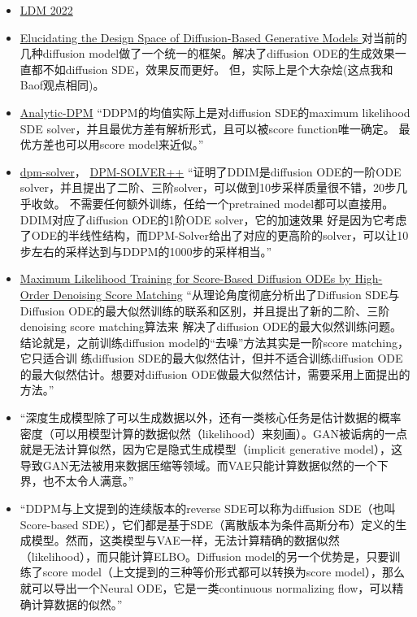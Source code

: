 \begin{itemize}
  \item \href{https://arxiv.org/abs/2112.10752}{LDM 2022}

  \item \href{https://arxiv.org/pdf/2206.00364.pdf}{Elucidating the Design Space of Diffusion-Based Generative Models }
  对当前的几种diffusion model做了一个统一的框架。解决了diffusion ODE的生成效果一直都不如diffusion SDE，效果反而更好。
  但，实际上是个大杂烩(这点我和Baof观点相同)。
  \item \href{https://arxiv.org/abs/2201.06503}{Analytic-DPM}
  “DDPM的均值实际上是对diffusion SDE的maximum likelihood SDE solver，并且最优方差有解析形式，且可以被score function唯一确定。
  最优方差也可以用score model来近似。”
  \item \href{https://github.com/LuChengTHU/dpm-solver}{dpm-solver}，
  \href{https://arxiv.org/pdf/2211.01095.pdf}{DPM-SOLVER++}
  “证明了DDIM是diffusion ODE的一阶ODE solver，并且提出了二阶、三阶solver，可以做到10步采样质量很不错，20步几乎收敛。
  不需要任何额外训练，任给一个pretrained model都可以直接用。 DDIM对应了diffusion ODE的1阶ODE solver，它的加速效果
  好是因为它考虑了ODE的半线性结构，而DPM-Solver给出了对应的更高阶的solver，可以让10步左右的采样达到与DDPM的1000步的采样相当。”
  \item \href{https://arxiv.org/pdf/2206.08265.pdf}{Maximum Likelihood Training for Score-Based Diffusion ODEs by High-Order Denoising Score Matching}
  “从理论角度彻底分析出了Diffusion SDE与Diffusion ODE的最大似然训练的联系和区别，并且提出了新的二阶、三阶denoising score matching算法来
  解决了diffusion ODE的最大似然训练问题。结论就是，之前训练diffusion model的“去噪”方法其实是一阶score matching，它只适合训
  练diffusion SDE的最大似然估计，但并不适合训练diffusion ODE的最大似然估计。想要对diffusion ODE做最大似然估计，需要采用上面提出的方法。”
  \item “深度生成模型除了可以生成数据以外，还有一类核心任务是估计数据的概率密度（可以用模型计算的数据似然（likelihood）来刻画）。GAN被诟病的一点就是无法计算似然，因为它是隐式生成模型（implicit generative model），这导致GAN无法被用来数据压缩等领域。而VAE只能计算数据似然的一个下界，也不太令人满意。”
  \item “DDPM与上文提到的连续版本的reverse SDE可以称为diffusion SDE（也叫Score-based SDE），它们都是基于SDE（离散版本为条件高斯分布）定义的生成模型。然而，这类模型与VAE一样，无法计算精确的数据似然（likelihood），而只能计算ELBO。Diffusion model的另一个优势是，只要训练了score model（上文提到的三种等价形式都可以转换为score model），那么就可以导出一个Neural ODE，它是一类continuous normalizing flow，可以精确计算数据的似然。”


\end{itemize}
